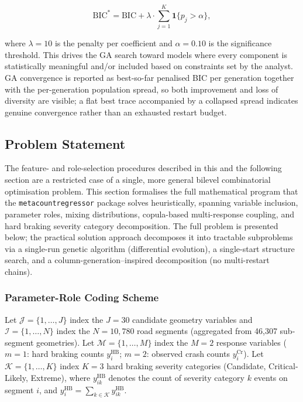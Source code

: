 \documentclass[letterpaper,8pt]{extarticle}  %
\begin{document}
\begin{doublespacing}
\begin{linenumbers}
\begin{equation}
\text{BIC}^* = \text{BIC} + \lambda \cdot \sum_{j=1}^{K} \mathbf{1}\{p_j > \alpha\},\label{eq:penbic}
\end{equation}

where $\lambda = 10$ is the penalty per coefficient and $\alpha = 0.10$ is the significance threshold. This drives the GA search toward models where every component is statistically meaningful and/or included based on constraints set by the analyst. GA convergence is reported as best-so-far penalised BIC per generation together with the per-generation population spread, so both improvement and loss of diversity are visible; a flat best trace accompanied by a collapsed spread indicates genuine convergence rather than an exhausted restart budget. 

\subsection{Problem Statement}\label{sec:mathprogram}

The feature- and role-selection procedures described in this and the following section are a restricted case of a single, more general bilevel combinatorial optimisation problem. This section formalises the full mathematical program that the \texttt{metacount\allowbreak regressor} package solves heuristically, spanning variable inclusion, parameter roles, mixing distributions, copula-based multi-response coupling, and hard braking severity category decomposition. The full problem is presented below; the practical solution approach decomposes it into tractable subproblems via a single-run genetic algorithm (differential evolution), a single-start structure search, and a column-generation--inspired decomposition (no multi-restart chains).

\subsubsection*{Parameter-Role Coding Scheme}

Let $\mathcal{J} = \{1,\dots,J\}$ index the $J=30$ candidate geometry variables and $\mathcal{I}=\{1,\dots,N\}$ index the $N=10{,}780$ road segments (aggregated from 46,307 sub-segment geometries). Let $\mathcal{M} = \{1,\dots,M\}$ index the $M=2$ response variables ($m=1$: hard braking counts $y_i^{\text{HB}}$; $m=2$: observed crash counts $y_i^{\text{Cr}}$). Let $\mathcal{K} = \{1,\dots,K\}$ index $K=3$ hard braking severity categories (Candidate, Critical-Likely, Extreme), where $y_{ik}^{\text{HB}}$ denotes the count of severity category $k$ events on segment $i$, and $y_i^{\text{HB}} = \sum_{k \in \mathcal{K}} y_{ik}^{\text{HB}}$.


\end{linenumbers}
\end{doublespacing}
\end{document}
